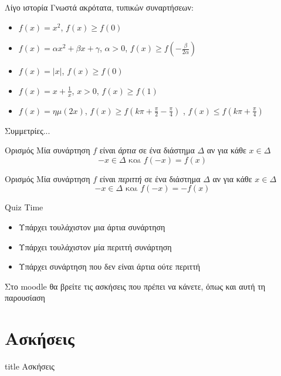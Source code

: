 \documentclass{presentation}
\begin{document}
\begin{frame}{Λίγο ιστορία}
  Γνωστά ακρότατα, τυπικών συναρτήσεων:
  \begin{itemize}
    \item $f(x)=x^2$\pause, $f(x)\ge f(0)$ \pause
    \item $f(x)=αx^2+βx+γ$, $α>0$\pause, $f(x)\ge f(-\frac{β}{2α})$ \pause
    \item $f(x)=|x|$\pause, $f(x)\ge f(0)$ \pause
    \item $f(x)=x+\frac{1}{x}$, $x>0$\pause, $f(x)\ge f(1)$
    \item $f(x)=ημ(2x)$\pause, $f(x)\ge f(k\pi + \frac{\pi}{2} - \frac{\pi}{4})$ \pause, $f(x)\le f(k\pi + \frac{\pi}{4})$
  \end{itemize}
\end{frame}

\begin{frame}{Συμμετρίες...}
  \begin{block}{Ορισμός}
    Μία συνάρτηση $f$ είναι \emph{άρτια} σε ένα διάστημα $Δ$ αν για κάθε  $ x\in Δ$
    $$-x\in Δ \text{ και } f(-x)=f(x)$$
  \end{block} \pause
  \begin{block}{Ορισμός}
    Μία συνάρτηση $f$ είναι \emph{περιττή} σε ένα διάστημα $Δ$ αν για κάθε  $ x\in Δ$
    $$-x\in Δ \text{ και } f(-x)=-f(x)$$
  \end{block}
\end{frame}

\begin{frame}{Quiz Time}
  \begin{itemize}
    \item Υπάρχει τουλάχιστον μια άρτια συνάρτηση \pause
    \item Υπάρχει τουλάχιστον μία περιττή συνάρτηση \pause
    \item Υπάρχει συνάρτηση που δεν είναι άρτια ούτε περιττή
  \end{itemize}
\end{frame}

\begin{frame}[noframenumbering]
  Στο moodle θα βρείτε τις ασκήσεις που πρέπει να κάνετε, όπως και αυτή τη παρουσίαση
\end{frame}

\section{Ασκήσεις}

\begin{frame}[noframenumbering]
  \vfill
  \centering
  \begin{beamercolorbox}[sep=8pt,center,shadow=true,rounded=true]{title}
    Ασκήσεις
  \end{beamercolorbox}
  \vfill
\end{frame}
\end{document}
